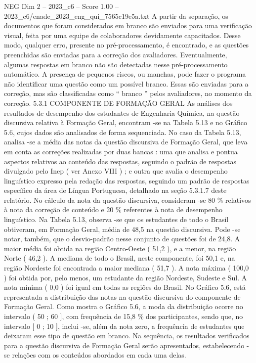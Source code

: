 \begin{textsample}{NEG Dim 2 – 2023\_c6 – Score 1.00 – 2023\_c6/enade\_2023\_eng\_qui\_7565c19e5a.txt}
A partir da separação, os documentos que foram considerados em branco são enviados para uma verificação visual, feita por uma equipe de colaboradores devidamente capacitados.
Desse modo, qualquer erro, presente no pré-processamento, é encontrado, e as questões preenchidas são enviadas para a correção dos avaliadores.
Eventualmente, algumas respostas em branco não são detectadas nesse pré-processamento automático.
A presença de pequenos riscos, ou manchas, pode fazer o programa não identificar uma questão como um possível branco.
Essas são enviadas para a correção, mas são classificadas como “ branco ” pelos avaliadores, no momento da correção. 5.3.1 COMPONENTE DE FORMAÇÃO GERAL As análises dos resultados de desempenho dos estudantes de Engenharia Química, na questão discursiva relativa à Formação Geral, encontram -se na Tabela 5.13 e no Gráfico 5.6, cujos dados são analisados de forma sequenciada.
No caso da Tabela 5.13, analisa -se a média das notas da questão discursiva de Formação Geral, que leva em conta as correções realizadas por duas bancas : uma que analisa e pontua aspectos relativos ao conteúdo das respostas, seguindo o padrão de respostas divulgado pelo Inep ( ver Anexo VIII ) ; e outra que avalia o desempenho linguístico expresso pela redação das respostas, seguindo um padrão de respostas específico da área de Língua Portuguesa, detalhado na seção 5.3.1.7 deste relatório.
No cálculo da nota da questão discursiva, consideram -se 80 \% relativos à nota da correção de conteúdo e 20 \% referentes à nota de desempenho linguístico.
Na Tabela 5.13, observa -se que os estudantes de todo o Brasil obtiveram, em Formação Geral, média de 48,5 na questão discursiva.
Pode -se notar, também, que o desvio-padrão nesse conjunto de questões foi de 24,8.
A maior média foi obtida na região Centro-Oeste ( 51,2 ), e a menor, na região Norte ( 46,2 ).
A mediana de todo o Brasil, neste componente, foi 50,1 e, na região Nordeste foi encontrada a maior mediana ( 51,7 ).
A nota máxima ( 100,0 ) foi obtida por, pelo menos, um estudante da região Nordeste, Sudeste e Sul.
A nota mínima ( 0,0 ) foi igual em todas as regiões do Brasil.
No Gráfico 5.6, está representada a distribuição das notas na questão discursiva do componente de Formação Geral.
Como mostra o Gráfico 5.6, a moda da distribuição ocorre no intervalo ( 50 ; 60 ], com frequência de 15,8 \% dos participantes, sendo que, no intervalo [ 0 ; 10 ], inclui -se, além da nota zero, a frequência de estudantes que deixaram esse tipo de questão em branco.
Na sequência, os resultados verificados para a questão discursiva de Formação Geral serão apresentados, estabelecendo -se relações com os conteúdos abordados em cada uma delas.

\end{textsample}
